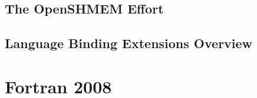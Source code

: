 \documentclass[10pt]{book}
\begin{document}



\section{The OpenSHMEM Effort}\label{subsec:openshmem_effort}


\section{Language Binding Extensions Overview}\label{subsec:lang_ext_overview}


\clearpage

\chapter{Fortran 2008}

\clearpage
{}
{}
\printindex
\end{document}
